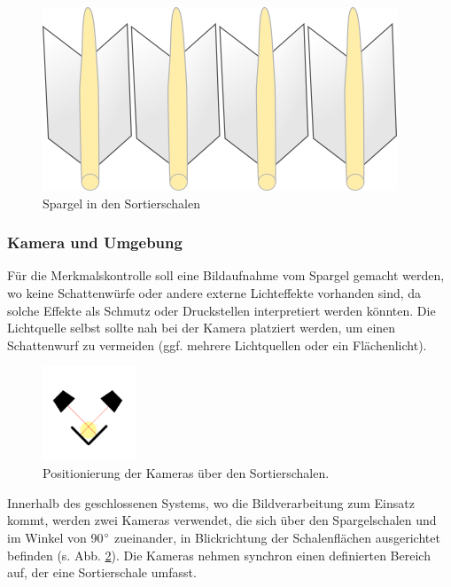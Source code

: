 \documentclass{ezb}
\begin{document}
\begin{figure}[!h]
	\begin{center}
		\includegraphics[scale=1.0]{sortierschalen.png}
	\end{center}
	\caption{Spargel in den Sortierschalen}
	\label{fig:sortierschale}
\end{figure}

\subsubsection*{Kamera und Umgebung}
Für die Merkmalskontrolle soll eine Bildaufnahme vom Spargel gemacht werden, wo keine Schattenwürfe oder andere externe Lichteffekte vorhanden sind, da solche Effekte als Schmutz oder Druckstellen interpretiert werden könnten. Die Lichtquelle selbst sollte nah bei der Kamera platziert werden, um einen Schattenwurf zu vermeiden (ggf. mehrere Lichtquellen oder ein Flächenlicht).\\
\begin{figure}
\includegraphics[width=0.25\textwidth]{kameras.png}
\caption{\label{fig:kameras}Positionierung der Kameras über den Sortierschalen.}
\end{figure}
Innerhalb des geschlossenen Systems, wo die Bildverarbeitung zum Einsatz kommt, werden zwei Kameras verwendet, die sich über den Spargelschalen und im Winkel von 90$\degree$ zueinander, in Blickrichtung der Schalenflächen ausgerichtet befinden (s. Abb. \ref{fig:kameras}). Die Kameras nehmen synchron einen definierten Bereich auf, der eine Sortierschale umfasst.
\clearpage
\end{document}
